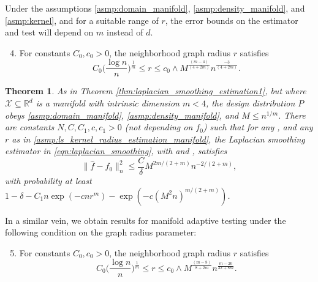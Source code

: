 \documentclass[twoside]{article}
\newcommand{\Reals}{\mathbb{R}}
\newcommand{\1}{\mathbf{1}}
\newcommand{\Rd}{\Reals^d}
\newcommand{\Xset}{\mathcal{X}}
\newcommand{\wh}[1]{\widehat{#1}}
\newtheorem{theorem}{Theorem}
\theoremstyle{definition}
\theoremstyle{remark}
\begin{document}
Under the assumptions \ref{asmp:domain_manifold}, \ref{asmp:density_manifold}, and \ref{asmp:kernel}, and for a suitable range of $r$, the error bounds on the estimator \smash{$\wh{f}$} and test \smash{$\wh{\varphi}$} will depend on $m$ instead of $d$. 
\begin{enumerate}[label=(R\arabic*)]
	\setcounter{enumi}{3}
	\item 
	\label{asmp:ls_kernel_radius_estimation_manifold}
	For constants $C_0,c_0>0$, the neighborhood graph radius $r$ satisfies 
	\begin{equation*}
	C_0\biggl(\frac{\log n}{n}\biggr)^{\frac{1}{m}} \leq r \leq c_0 \wedge  M^{\frac{(m - 4)}{(4 + 2m)}} n^{\frac{-3}{(4 + 2m)}}.
	\end{equation*}
\end{enumerate}

\begin{theorem}
	\label{thm:laplacian_smoothing_estimation_manifold}
	As in Theorem \ref{thm:laplacian_smoothing_estimation1}, but where $\Xset \subseteq \Rd$ is a manifold with intrinsic dimension $m < 4$, the design distribution $P$ obeys \ref{asmp:domain_manifold}, \ref{asmp:density_manifold}, and $M \leq n^{1/m}$. There are constants $N,C,C_1,c,c_1>0$ (not depending on $f_0$) such that for any , and any $r$ as in \ref{asmp:ls_kernel_radius_estimation_manifold}, the Laplacian smoothing estimator \smash{$\wh{f}$} in \eqref{eqn:laplacian_smoothing}, with  and , satisfies
	\begin{equation*}
	\bigl\|\wh{f} - f_0\bigr\|_n^2 \leq \frac{C}{\delta} M^{2m/(2 + m)} n^{-2/(2 + m)},
	\end{equation*}
	with probability at least $1 - \delta -  C_1 n\exp(-cnr^m) - \exp(-c(M^2n)^{m/(2+m)})$.
\end{theorem}
In a similar vein, we obtain results for manifold adaptive testing under the following condition on the graph radius parameter:
\begin{enumerate}[label=(R\arabic*)]
	\setcounter{enumi}{4}
	\item 
	\label{asmp:ls_kernel_radius_testing_manifold}
	For constants $C_0,c_0>0$, the neighborhood graph radius $r$ satisfies 
	\begin{equation*}
	C_0\biggl(\frac{\log n}{n}\biggr)^{\frac{1}{m}} \leq r \leq c_0 \wedge M^{\frac{(m - 8)}{8 + 2m}} n^{\frac{m - 20}{32 + 8m}}.
	\end{equation*}
\end{enumerate}
\end{document}
